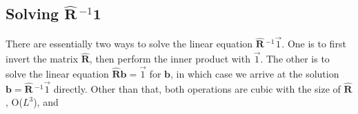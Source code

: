 \documentclass[12pt,journal,captionsoff,onecolumn]{IEEEtran}
\newcommand\mat[1]{\boldsymbol{#1}}
\newcommand\1{\vec 1}
\newcommand*\eR{\mat{\hat R}}
\newcommand*\eRi{\hat{\mat R}\,\!^{-1}}
\begin{document}
% 
% 
% 




\cite{Owens2007} \cite{Lee2010}




\subsection{Solving $\hat{\boldsymbol{R}}$$\,\!^{-1}$$\mathbf{1}$}

There are essentially two ways to solve the linear equation $\eRi\1$. One is to first invert the matrix $\eR$, then perform the inner product with $\1$. The other is to solve the linear equation $\hat{\boldsymbol{R}}\boldsymbol{b} = \1$ for $\boldsymbol{b}$, in which case we arrive at the solution $\boldsymbol{b}  = \eRi\1$ directly. Other than that, both operations are cubic with the size of $\eR$, O($L^3$), and 
\end{document}
